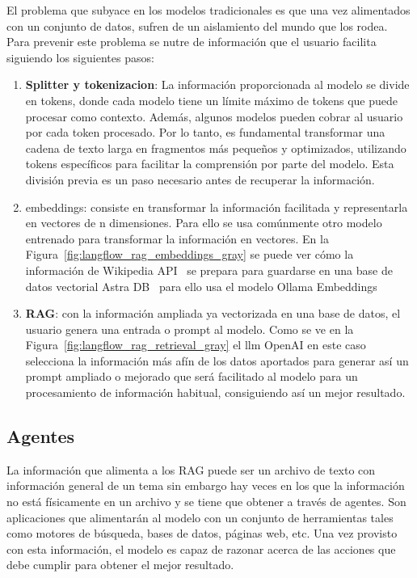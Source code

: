 	El problema que subyace en los modelos tradicionales es que una vez alimentados con un conjunto de datos, sufren de un aislamiento del mundo que los rodea. Para prevenir este problema se nutre de información que el usuario facilita siguiendo los siguientes pasos:
	\begin{enumerate}
		\item \textbf{Splitter y \gls{tokenizacion}}: La información proporcionada al modelo se divide en tokens, donde cada modelo tiene un límite máximo de tokens que puede procesar como contexto. Además, algunos modelos pueden cobrar al usuario por cada token procesado. Por lo tanto, es fundamental transformar una cadena de texto larga en fragmentos más pequeños y optimizados, utilizando tokens específicos para facilitar la comprensión por parte del modelo. Esta división previa es un paso necesario antes de recuperar la información.
	
		\item \gls{embeddings}: consiste en transformar la información facilitada y representarla en vectores de n dimensiones. Para ello se usa comúnmente otro modelo entrenado para transformar la información en vectores.
		En la Figura~\ref{fig:langflow_rag_embeddings_gray} se puede ver cómo la información de Wikipedia API~\cite{wikimedia_api} se prepara para guardarse en una base de datos vectorial Astra DB~\cite{datastax_astra} para ello usa el modelo Ollama Embeddings
		
		
		\item \textbf{RAG}: con la información ampliada ya vectorizada en una base de datos, el usuario genera una entrada o prompt al modelo. Como se ve en la Figura~\ref{fig:langflow_rag_retrieval_gray} el \acrshort{llm} OpenAI en este caso selecciona la información más afín de los datos aportados para generar así un prompt ampliado o mejorado que será facilitado al modelo para un procesamiento de información habitual, consiguiendo así un mejor resultado.
		
	\end{enumerate}
		
	\subsection{Agentes}
	\label{sec:agentes}
	La información que alimenta a los RAG puede ser un archivo de texto con información general de un tema sin embargo hay veces en los que la información no está físicamente en un archivo y se tiene que obtener a través de \gls{agentes}.
	Son aplicaciones que alimentarán al modelo con un conjunto de herramientas tales como motores de búsqueda, bases de datos, páginas web, etc. Una vez provisto con esta información, el modelo es capaz de razonar acerca de las acciones que debe cumplir para obtener el mejor resultado.

